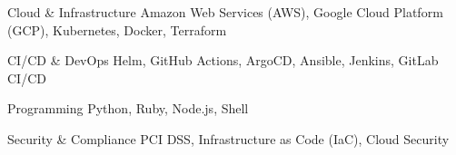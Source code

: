 \begin{cvskills}

\cvskill
    {Cloud \& Infrastructure}
    {Amazon Web Services (AWS), Google Cloud Platform (GCP), Kubernetes, Docker, Terraform}

\cvskill
    {CI/CD \& DevOps}
    {Helm, GitHub Actions, ArgoCD, Ansible, Jenkins, GitLab CI/CD}

\cvskill
    {Programming}
    {Python, Ruby, Node.js, Shell}

\cvskill
    {Security \& Compliance}
    {PCI DSS, Infrastructure as Code (IaC), Cloud Security}

\end{cvskills}